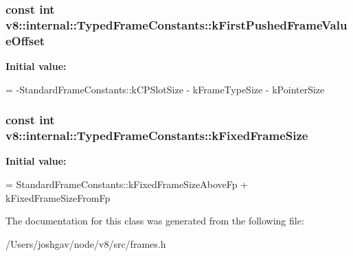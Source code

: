 \subsubsection[{\texorpdfstring{k\+First\+Pushed\+Frame\+Value\+Offset}{kFirstPushedFrameValueOffset}}]{\setlength{\rightskip}{0pt plus 5cm}const int v8\+::internal\+::\+Typed\+Frame\+Constants\+::k\+First\+Pushed\+Frame\+Value\+Offset\hspace{0.3cm}{\ttfamily [static]}}\hypertarget{classv8_1_1internal_1_1_typed_frame_constants_a7b2a60dee8b053a303828698443d07e3}{}\label{classv8_1_1internal_1_1_typed_frame_constants_a7b2a60dee8b053a303828698443d07e3}
{\bfseries Initial value\+:}
\begin{DoxyCode}
=
      -StandardFrameConstants::kCPSlotSize - kFrameTypeSize - kPointerSize
\end{DoxyCode}
\subsubsection[{\texorpdfstring{k\+Fixed\+Frame\+Size}{kFixedFrameSize}}]{\setlength{\rightskip}{0pt plus 5cm}const int v8\+::internal\+::\+Typed\+Frame\+Constants\+::k\+Fixed\+Frame\+Size\hspace{0.3cm}{\ttfamily [static]}}\hypertarget{classv8_1_1internal_1_1_typed_frame_constants_ac4aa1f33bbed1aac131c26f7579a45ac}{}\label{classv8_1_1internal_1_1_typed_frame_constants_ac4aa1f33bbed1aac131c26f7579a45ac}
{\bfseries Initial value\+:}
\begin{DoxyCode}
=
      StandardFrameConstants::kFixedFrameSizeAboveFp + kFixedFrameSizeFromFp
\end{DoxyCode}


The documentation for this class was generated from the following file\+:\begin{DoxyCompactItemize}
\item 
/\+Users/joshgav/node/v8/src/frames.\+h\end{DoxyCompactItemize}
